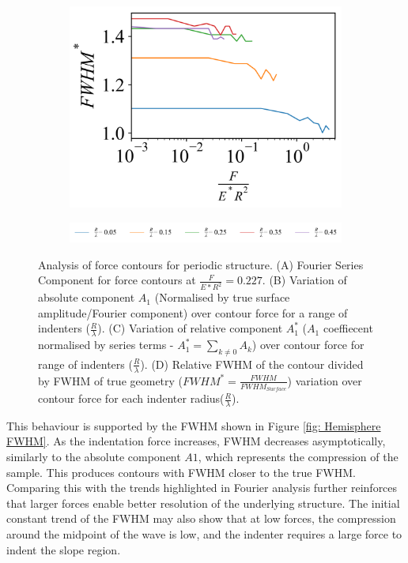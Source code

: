 \begin{figure}[ht]
\begin{subfigure}[t]{0.325\textwidth}
        \includegraphics[width=1\linewidth]{Figures/Wave-FWHM.png}
    \end{subfigure}    

    \hfill
    
    \begin{subfigure}[t]{1\textwidth}
        \centering
        \includegraphics[width=1\linewidth]{Figures/Wave-Legend.png}
    \end{subfigure}

    
    \caption{\label{fig: Wave FWHM/Fourier}Analysis of force contours for periodic structure. (A) Fourier Series Component for force contours at $\frac{F}{E*R^2} = 0.227$. (B) Variation of absolute component $A_1$ (Normalised by true surface amplitude/Fourier component) over contour force for a range of indenters ($\frac{R}{\lambda}$). (C) Variation of relative component $A_1^*$ ($A_1$ coeffiecent normalised by series terms - $A_1^*=\sum_{k\neq0}A_k$) over contour force for range of indenters ($\frac{R}{\lambda}$). (D) Relative FWHM of the contour divided by FWHM of true geometry ($FWHM^*=\frac{FWHM}{FWHM_{Surface}}$) variation over contour force for each indenter radius($\frac{R}{\lambda}$).}
    
\end{figure}

This behaviour is supported by the FWHM shown in Figure \ref{fig: Hemisphere FWHM}. As the indentation force increases, FWHM decreases asymptotically, similarly to the absolute component $A1$, which represents the compression of the sample. This produces contours with FWHM closer to the true FWHM. Comparing this with the trends highlighted in Fourier analysis further reinforces that larger forces enable better resolution of the underlying structure. The initial constant trend of the FWHM may also show that at low forces, the compression around the midpoint of the wave is low, and the indenter requires a large force to indent the slope region.

